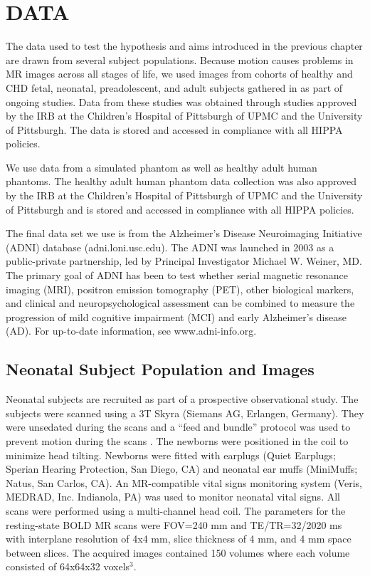 \chapter{DATA}

The data used to test the hypothesis and aims introduced in the previous chapter are drawn from several subject populations. Because motion causes problems in MR images across all stages of life, we used images from cohorts of healthy and CHD fetal, neonatal, preadolescent, and adult subjects gathered in as part of ongoing studies. Data from these studies was obtained through studies approved by the IRB at the Children's Hospital of Pittsburgh of UPMC and the University of Pittsburgh. The data is stored and accessed in compliance with all HIPPA policies.

We use data from a simulated phantom as well as healthy adult human phantoms. The healthy adult human phantom data collection was also approved by the IRB at the Children's Hospital of Pittsburgh of UPMC and the University of Pittsburgh and is stored and accessed in compliance with all HIPPA policies.

The final data set we use is from the Alzheimer's Disease Neuroimaging Initiative (ADNI) database (adni.loni.usc.edu). The ADNI was launched in 2003 as a public-private partnership, led by Principal Investigator Michael W. Weiner, MD. The primary goal of ADNI has been to test whether serial magnetic resonance imaging (MRI), positron emission tomography (PET), other biological markers, and clinical and neuropsychological assessment can be combined to measure the progression of mild cognitive impairment (MCI) and early Alzheimer's disease (AD). For up-to-date information, see www.adni-info.org.

\section{Neonatal Subject Population and Images}

Neonatal subjects are recruited as part of a prospective observational study. The subjects were scanned using a 3T Skyra (Siemans AG, Erlangen, Germany). They were unsedated during the scans and a ``feed and bundle'' protocol was used to prevent motion during the scans \cite{Windram2011}. The newborns were positioned in the coil to minimize head tilting. Newborns were fitted with earplugs (Quiet Earplugs; Sperian Hearing Protection, San Diego, CA) and neonatal ear muffs (MiniMuffs; Natus, San Carlos, CA). An MR-compatible vital signs monitoring system (Veris, MEDRAD, Inc. Indianola, PA) was used to monitor neonatal vital signs. All scans were performed using a multi-channel head coil. The parameters for the resting-state BOLD MR scans were FOV=240 mm and TE/TR=32/2020 ms with interplane resolution of 4x4 mm, slice thickness of 4 mm, and 4 mm space between slices. The acquired images contained 150 volumes where each volume consisted of 64x64x32 voxels$^3$.

